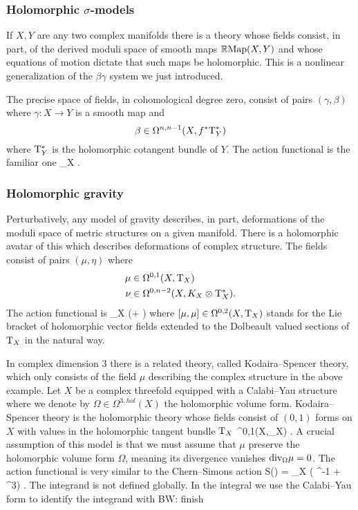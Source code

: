 \documentclass[11pt]{amsart}
\def\del{\partial}
\def\brian#1{{\textcolor{blue!65!red}{BW: {#1}}}}
\begin{document}
\subsubsection{Holomorphic $\sigma$-models}

If $X,Y$ are any two complex manifolds there is a theory whose fields consist, in part, of the derived moduli space of smooth maps $\mathbb R {\rm Map}(X,Y)$ and whose equations of motion dictate that such maps be holomorphic.
This is a nonlinear generalization of the $\beta\gamma$ system we just introduced. 
  
The precise space of fields, in cohomological degree zero, consist of pairs $(\gamma, \beta)$ where $\gamma \colon X \to Y$ is a smooth map and 
\[
\beta \in \Omega^{n,n-1}(X, f^* {\rm T}^*_Y) 
\]
where ${\rm T}^*_Y$ is the holomorphic cotangent bundle of $Y$. 
The action functional is the familiar one
\beqn
\int_X \beta \dbar \gamma .
\eeqn 


\subsubsection{Holomorphic gravity}

Perturbatively, any model of gravity describes, in part, deformations of the moduli space of metric structures on a given manifold. 
There is a holomorphic avatar of this which describes deformations of complex structure.
The fields consist of pairs $(\mu, \eta)$ where
\begin{align*}
\mu & \in \Omega^{0,1}(X, {\rm T}_X) \\
\nu & \in \Omega^{0,n-2}(X, K_X \otimes {\rm T}^*_X) .
\end{align*}
The action functional is
\beqn
\int_X \left(\eta \dbar \mu +  \eta [\mu,\mu]\right)
\eeqn
where $[\mu, \mu] \in \Omega^{0,2} (X, {\rm T}_X)$ stands for the Lie bracket of holomorphic vector fields extended to the Dolbeault valued sections of ${\rm T}_X$ in the natural way.

In complex dimension $3$ there is a related theory, called Kodaira--Spencer theory, which only consists of the field $\mu$ describing the complex structure in the above example.
Let $X$ be a complex threefold equipped with a Calabi--Yau structure where we denote by $\Omega \in \Omega^{3,hol}(X)$ the holomorphic volume form.
Kodaira--Spencer theory is the holomorphic theory whose fields consist of $(0,1)$ forms on $X$ with values in the holomorphic tangent bundle ${\rm T}_X$
\beqn
\mu \in \Omega^{0,1}(X,\T_X) .
\eeqn 
A crucial assumption of this model is that we must assume that $\mu$ preserve the holomorphic volume form $\Omega$, meaning its divergence vanishes ${\rm div}_\Omega \mu = 0$.
The action functional is very similar to the Chern--Simons action
\beqn
S(\mu) = \int_X \left( \mu \dbar \del^{-1} \mu +  \mu^3\right) .
\eeqn
The integrand is not defined globally.
In the integral we use the Calabi--Yau form to identify the integrand with 
\brian{finish}
\end{document}
